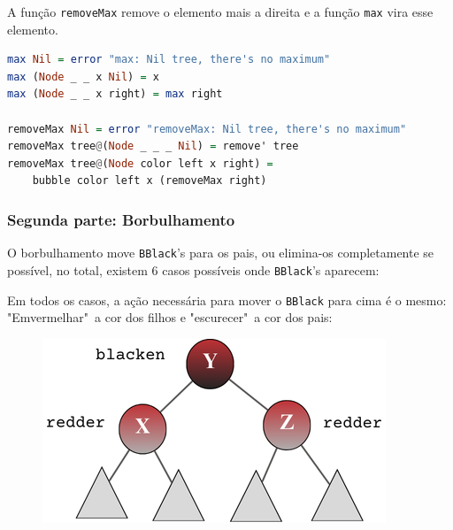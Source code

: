 A função \texttt{removeMax} remove o elemento mais a direita e a função \texttt{max} vira esse elemento.

\begin{lstlisting}[language=Haskell]
max Nil = error "max: Nil tree, there's no maximum"
max (Node _ _ x Nil) = x
max (Node _ _ x right) = max right

removeMax Nil = error "removeMax: Nil tree, there's no maximum"
removeMax tree@(Node _ _ _ Nil) = remove' tree
removeMax tree@(Node color left x right) = 
	bubble color left x (removeMax right)
\end{lstlisting}
\FloatBarrier



\subsubsection{Segunda parte: Borbulhamento}

O borbulhamento move \texttt{BBlack}'s para os pais, ou elimina-os completamente se possível, no total, existem 6 casos possíveis onde \texttt{BBlack}'s aparecem:

\begin{figure}[!ht]
	\centering
\end{figure}
\FloatBarrier

Em todos os casos, a ação necessária para mover o \texttt{BBlack} para cima é o mesmo: "Emvermelhar"\ a cor dos filhos e "escurecer"\ a cor dos pais:

\begin{figure}[!ht]
	\centering
	\includegraphics[scale=0.7]{figures/rubro-negra/bubble.png}
\end{figure}
\FloatBarrier

